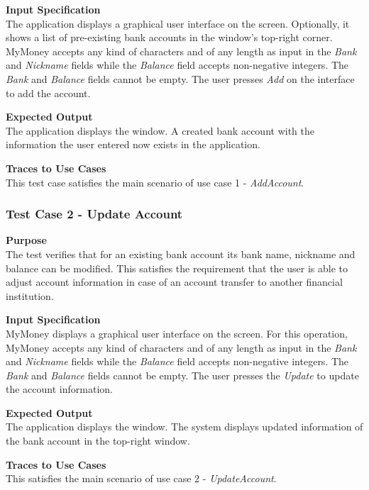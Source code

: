 \documentclass[12pt]{article}
\begin{document}
\noindent
    {\bf Input Specification}\\
    The application displays a graphical user interface on the screen.
    Optionally, it shows a list of pre-existing bank accounts in the window's top-right corner.
    MyMoney accepts any kind of characters and of any length as input in the \textit{Bank} and \textit{Nickname} fields while
    the \textit{Balance} field accepts non-negative integers. The \textit{Bank} and \textit{Balance} fields cannot be empty.
    The user presses \textit{Add} on the interface to add the account.
    
\noindent
    {\bf Expected Output}\\
    The application displays the window.
    A created bank account with the information the user entered now exists in the application.
    
\noindent
    {\bf Traces to Use Cases}\\
    This test case satisfies the main scenario of use case 1 - \textit{AddAccount}.

\subsubsection{Test Case 2 - Update Account} \label{TC-2}
\noindent
{\bf Purpose}\\
        The test verifies that for an existing bank account its bank name, nickname and balance can be modified.
        This satisfies the requirement that the user is able to adjust account information in case of an account transfer
        to another financial institution. 

\noindent
{\bf Input Specification}\\
            MyMoney displays a graphical user interface on the screen.
            For this operation, MyMoney accepts any kind of characters and of any length as
            input in the \textit{Bank} and \textit{Nickname} fields while the \textit{Balance} field accepts non-negative integers.
            The \textit{Bank} and \textit{Balance} fields cannot be empty. The user presses the \textit{Update} to update the account information.
            
\noindent
{\bf Expected Output}\\
    The application displays the window.    
    The system displays updated information of the bank account in the top-right window.

 \noindent
 {\bf Traces to Use Cases}\\
     This satisfies the main scenario of use case 2 - \textit{UpdateAccount}.
                 
\end{document}
